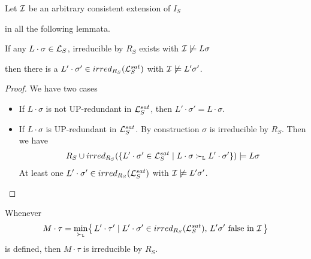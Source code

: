             Let \(\mathcal{I}\) be an arbitrary consistent extension of \(I_S\)

            in all the following lemmata.


        \begin{lemma}\label{existence}

        If any \(L\cdot\sigma\in\mathcal{L}_S\), irreducible by \(R_S\) exists with \(\mathcal{I}\not\models L\sigma\)

        then there is a \(L'\cdot\sigma'\in irred_{R_S}(\mathcal{L}_S^{sat})\) with \(\mathcal{I}\not\models L'\sigma'\).
        \end{lemma}

        \begin{proof}
            We have two cases

        \begin{itemize}
            \item If \(L\cdot\sigma\) is not UP-redundant in \(\mathcal{L}_S^{sat}\),
            then \(L'\cdot\sigma'=L\cdot\sigma\).
            \hfill\checkmark

            \item If \(L\cdot\sigma\) is UP-redundant in \(\mathcal{L}_S^{sat}\).
        By construction \(\sigma\) is irreducible by \(R_S\). Then we have
        \begin{align*}
            R_S \cup irred_{R_S}(
                \{
                L'\cdot\sigma'\in\mathcal{L}_S^{sat}
                \mid
                L\cdot\sigma \mathrel\succ_{\mathtt{L}} L'\cdot\sigma'
                \}
            )
            \models
            L\sigma
        \end{align*}
        At least one \(L'\cdot\sigma'\in irred_{R_S}(\mathcal{L}_S^{sat})\)
        with \(\mathcal{I}\not\models L'\sigma'\).
        \hfill\checkmark
        \end{itemize}
    \end{proof}


        \begin{lemma}\label{irreducible}
            Whenever
            \begin{gather*}
                M\cdot\tau = \min_{\mathrel\succ_{\mathtt{L}}}\!
                \left\{\,
                L'\cdot\tau' \mid
                L'\cdot\sigma' \in irred_{R_S}(\mathcal{L}_S^{sat}),\,
                L'\sigma'\text{ false in }\mathcal{I}\,
                \right\}
            \end{gather*}
            is defined, then \(M\cdot\tau\) is irreducible by \(R_S\).
        \end{lemma}

